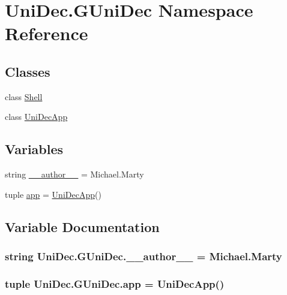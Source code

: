 \hypertarget{namespace_uni_dec_1_1_g_uni_dec}{}\section{Uni\+Dec.\+G\+Uni\+Dec Namespace Reference}
\label{namespace_uni_dec_1_1_g_uni_dec}
\subsection*{Classes}
\begin{DoxyCompactItemize}
\item 
class \hyperlink{class_uni_dec_1_1_g_uni_dec_1_1_shell}{Shell}
\item 
class \hyperlink{class_uni_dec_1_1_g_uni_dec_1_1_uni_dec_app}{Uni\+Dec\+App}
\end{DoxyCompactItemize}
\subsection*{Variables}
\begin{DoxyCompactItemize}
\item 
string \hyperlink{namespace_uni_dec_1_1_g_uni_dec_a2c5ac87598c130ba536f6a827b4ff1c4}{\+\_\+\+\_\+author\+\_\+\+\_\+} = \textquotesingle{}Michael.\+Marty\textquotesingle{}
\item 
tuple \hyperlink{namespace_uni_dec_1_1_g_uni_dec_afb8887595a1c2cd222f207cf380650f3}{app} = \hyperlink{class_uni_dec_1_1_g_uni_dec_1_1_uni_dec_app}{Uni\+Dec\+App}()
\end{DoxyCompactItemize}


\subsection{Variable Documentation}
\hypertarget{namespace_uni_dec_1_1_g_uni_dec_a2c5ac87598c130ba536f6a827b4ff1c4}{}
\subsubsection[{\+\_\+\+\_\+author\+\_\+\+\_\+}]{\setlength{\rightskip}{0pt plus 5cm}string Uni\+Dec.\+G\+Uni\+Dec.\+\_\+\+\_\+author\+\_\+\+\_\+ = \textquotesingle{}Michael.\+Marty\textquotesingle{}}\label{namespace_uni_dec_1_1_g_uni_dec_a2c5ac87598c130ba536f6a827b4ff1c4}
\hypertarget{namespace_uni_dec_1_1_g_uni_dec_afb8887595a1c2cd222f207cf380650f3}{}
\subsubsection[{app}]{\setlength{\rightskip}{0pt plus 5cm}tuple Uni\+Dec.\+G\+Uni\+Dec.\+app = {\bf Uni\+Dec\+App}()}\label{namespace_uni_dec_1_1_g_uni_dec_afb8887595a1c2cd222f207cf380650f3}
